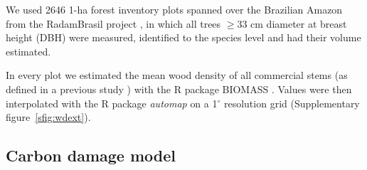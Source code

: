 \documentclass{article}
\begin{document}
We used 2646 1-ha forest inventory plots spanned over the Brazilian Amazon from the RadamBrasil project \cite{Radam2017}, in which all trees $\geq$33 cm diameter at breast height (DBH) were measured, identified to the species level and had their volume estimated. 

In every plot we estimated the mean wood density of all commercial stems (as defined in a previous study \cite{Piponiotc}) with the R package BIOMASS \cite{Rejou-Mechain2017}.
Values were then interpolated with the R package \textit{automap} \cite{gstat} on a 1$^{\circ}$ resolution grid (Supplementary figure~\ref{sfig:wdext}).


\subsection{Carbon damage model}
\label{supmat:cdam}
\end{document}
